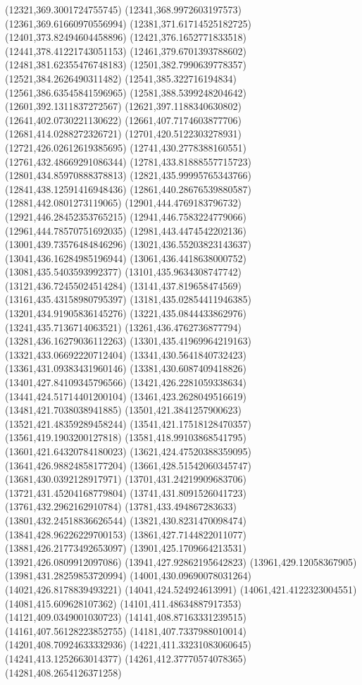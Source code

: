 {(12321,369.3001724755745)
(12341,368.9972603197573)
(12361,369.61660970556994)
(12381,371.61714525182725)
(12401,373.82494604458896)
(12421,376.1652771833518)
(12441,378.41221743051153)
(12461,379.6701393788602)
(12481,381.62355476748183)
(12501,382.7990639778357)
(12521,384.2626490311482)
(12541,385.322716194834)
(12561,386.63545841596965)
(12581,388.5399248204642)
(12601,392.1311837272567)
(12621,397.1188340630802)
(12641,402.0730221130622)
(12661,407.7174603877706)
(12681,414.0288272326721)
(12701,420.5122303278931)
(12721,426.02612619385695)
(12741,430.2778388160551)
(12761,432.48669291086344)
(12781,433.81888557715723)
(12801,434.85970888378813)
(12821,435.99995765343766)
(12841,438.12591416948436)
(12861,440.28676539880587)
(12881,442.0801273119065)
(12901,444.4769183796732)
(12921,446.28452353765215)
(12941,446.7583224779066)
(12961,444.78570751692035)
(12981,443.4474542202136)
(13001,439.73576484846296)
(13021,436.55203823143637)
(13041,436.16284985196944)
(13061,436.4418638000752)
(13081,435.5403593992377)
(13101,435.9634308747742)
(13121,436.72455024514284)
(13141,437.819658474569)
(13161,435.43158980795397)
(13181,435.02854411946385)
(13201,434.91905836145276)
(13221,435.0844433862976)
(13241,435.7136714063521)
(13261,436.4762736877794)
(13281,436.16279036112263)
(13301,435.41969964219163)
(13321,433.06692220712404)
(13341,430.5641840732423)
(13361,431.09383431960146)
(13381,430.6087409418826)
(13401,427.84109345796566)
(13421,426.2281059338634)
(13441,424.51714401200104)
(13461,423.2628049516619)
(13481,421.7038038941885)
(13501,421.3841257900623)
(13521,421.48359289458244)
(13541,421.17518128470357)
(13561,419.1903200127818)
(13581,418.99103868541795)
(13601,421.64320784180023)
(13621,424.47520388359095)
(13641,426.98824858177204)
(13661,428.51542060345747)
(13681,430.0392128917971)
(13701,431.24219909683706)
(13721,431.45204168779804)
(13741,431.8091526041723)
(13761,432.2962162910784)
(13781,433.494867283633)
(13801,432.24518836626544)
(13821,430.8231470098474)
(13841,428.96226229700153)
(13861,427.7144822011077)
(13881,426.21773492653097)
(13901,425.1709664213531)
(13921,426.0809912097086)
(13941,427.92862195642823)
(13961,429.12058367905)
(13981,431.28259853720994)
(14001,430.09690078031264)
(14021,426.8178839493221)
(14041,424.524924613991)
(14061,421.4122323004551)
(14081,415.609628107362)
(14101,411.48634887917353)
(14121,409.0349001030723)
(14141,408.87163331239515)
(14161,407.56128223852755)
(14181,407.7337988010014)
(14201,408.70924633332936)
(14221,411.33231083060645)
(14241,413.1252663014377)
(14261,412.37770574078365)
(14281,408.2654126371258)
}
